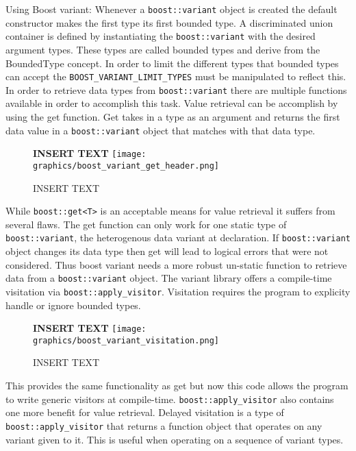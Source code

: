 \documentclass[letterpaper, 12pt]{article}
\begin{document}
Using Boost variant:
Whenever a \lstinline|boost::variant| object is created the default constructor makes the first type its first bounded type.
A discriminated union container is defined by instantiating the \lstinline|boost::variant| with the desired argument types.
These types are called bounded types and derive from the BoundedType concept. In order to limit the different
types that bounded types can accept the \lstinline|BOOST_VARIANT_LIMIT_TYPES| must be manipulated to reflect this.
In order to retrieve data types from \lstinline|boost::variant| there are multiple functions available in order to accomplish this task.
Value retrieval can be accomplish by using the get function. Get takes in a type as an argument and returns the first
data value in a \lstinline|boost::variant| object that matches with that data type.
\par\vspace{\baselineskip}
\begin{figure}
  \centering
  \textbf{INSERT TEXT}
  \texttt{[image: graphics/boost\_variant\_get\_header.png]}
  \caption{INSERT TEXT}
\end{figure}

While \lstinline|boost::get<T>| is an acceptable means for value retrieval it suffers from several flaws.
The get function can only work for one static type of \lstinline|boost::variant|,
the heterogenous data variant at declaration. If \lstinline|boost::variant| object
changes its data type then get will lead to logical errors that were not considered.
Thus boost variant needs a more robust un-static function to retrieve
data from a \lstinline|boost::variant| object. The variant library offers a compile-time visitation
via \lstinline|boost::apply_visitor|. Visitation requires the program to explicity handle or ignore bounded types.
\par\vspace{\baselineskip}

\begin{figure}
  \centering
  \textbf{INSERT TEXT}
  \texttt{[image: graphics/boost\_variant\_visitation.png]}
  \caption{INSERT TEXT}
\end{figure}

This provides the same functionality as get but now this code allows the program to write
generic visitors at compile-time. \lstinline|boost::apply_visitor| also contains one more benefit for
value retrieval. Delayed visitation is a type of \lstinline|boost::apply_visitor| that returns
a function object that operates on any variant given to it. This is useful when operating on a sequence of
variant types.
\par\vspace{\baselineskip}
\end{document}
